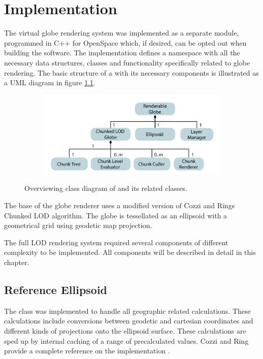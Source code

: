 \chapter{Implementation}
The virtual globe rendering system was implemented as a separate module, programmed in C++ for OpenSpace which, if desired, can be opted out when building the software. The implementation defines a namespace with all the necessary data structures, classes and functionality specifically related to globe rendering. The basic structure of a  with its necessary components is illustrated as a UML diagram in figure \ref{fig:renderableglobe}.

\begin{figure}[htbp]
    \centering
    \begin{subfigure}[bt]{0.8\textwidth}
        \includegraphics[width=\textwidth]{figures/implementation/renderable_globe.pdf}
    \end{subfigure}
    \caption{Overviewing class diagram of  and its related classes.}
    \label{fig:renderableglobe}
\end{figure}

The base of the globe renderer uses a modified version of Cozzi and Rings Chunked LOD algorithm. The globe is tessellated as an ellipsoid with a geometrical grid using geodetic map projection.

The full LOD rendering system required several components of different complexity to be implemented. All components will be described in detail in this chapter.

\section{Reference Ellipsoid}
The  class was implemented to handle all geographic related calculations.  These calculations include conversions between geodetic and cartesian coordinates and different kinds of projections onto the ellipsoid surface. These calculations are sped up by internal caching of a range of precalculated values. Cozzi and Ring provide a complete reference on the implementation \cite[p. 17]{cozzi11}.


